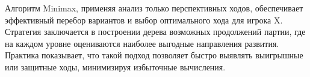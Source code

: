 \vspace{1em}

\noindent
Алгоритм Minimax, применяя анализ только перспективных ходов, обеспечивает эффективный перебор вариантов и выбор оптимального хода для игрока X. Стратегия заключается в построении дерева возможных продолжений партии, где на каждом уровне оцениваются наиболее выгодные направления развития. Практика показывает, что такой подход позволяет быстро выявлять выигрышные или защитные ходы, минимизируя избыточные вычисления.









